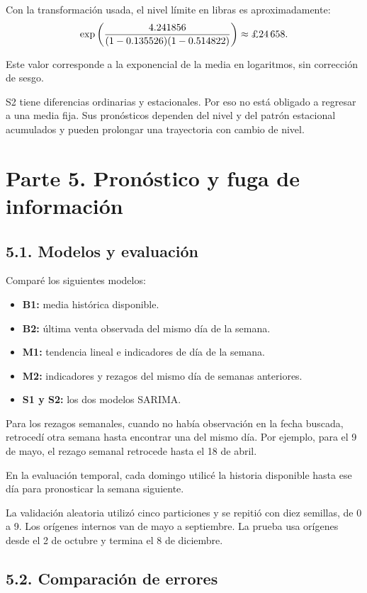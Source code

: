 \documentclass[11pt,letterpaper]{article}
\begin{document}
Con la transformación usada, el nivel límite en libras es aproximadamente:
\[
\exp\left(
\frac{4.241856}
{(1-0.135526)(1-0.514822)}
\right)
\approx
\text{\pounds}24\,658.
\]

Este valor corresponde a la exponencial de la media en logaritmos, sin corrección de sesgo.

S2 tiene diferencias ordinarias y estacionales. Por eso no está obligado a regresar a una media fija. Sus pronósticos dependen del nivel y del patrón estacional acumulados y pueden prolongar una trayectoria con cambio de nivel.

\section*{Parte 5. Pronóstico y fuga de información}

\subsection*{5.1. Modelos y evaluación}

Comparé los siguientes modelos:
\begin{itemize}
    \item \textbf{B1:} media histórica disponible.
    \item \textbf{B2:} última venta observada del mismo día de la semana.
    \item \textbf{M1:} tendencia lineal e indicadores de día de la semana.
    \item \textbf{M2:} indicadores y rezagos del mismo día de semanas anteriores.
    \item \textbf{S1 y S2:} los dos modelos SARIMA.
\end{itemize}

Para los rezagos semanales, cuando no había observación en la fecha buscada, retrocedí otra semana hasta encontrar una del mismo día. Por ejemplo, para el 9 de mayo, el rezago semanal retrocede hasta el 18 de abril.

En la evaluación temporal, cada domingo utilicé la historia disponible hasta ese día para pronosticar la semana siguiente.

La validación aleatoria utilizó cinco particiones y se repitió con diez semillas, de 0 a 9. Los orígenes internos van de mayo a septiembre. La prueba usa orígenes desde el 2 de octubre y termina el 8 de diciembre.

\subsection*{5.2. Comparación de errores}
\end{document}
